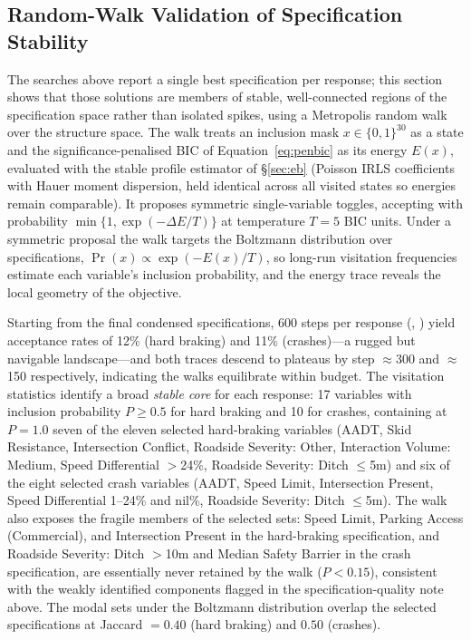 \documentclass[letterpaper,8pt]{extarticle}  %
\begin{document}
\begin{doublespacing}
\begin{linenumbers}
\FloatBarrier


\subsection{Random-Walk Validation of Specification Stability}\label{sec:randomwalk}

The searches above report a single best specification per response; this section shows that those solutions are members of stable, well-connected regions of the specification space rather than isolated spikes, using a Metropolis random walk over the structure space. The walk treats an inclusion mask $x \in \{0,1\}^{30}$ as a state and the significance-penalised BIC of Equation~\eqref{eq:penbic} as its energy $E(x)$, evaluated with the stable profile estimator of \S\ref{sec:eb} (Poisson IRLS coefficients with Hauer moment dispersion, held identical across all visited states so energies remain comparable). It proposes symmetric single-variable toggles, accepting with probability $\min\{1, \exp(-\Delta E / T)\}$ at temperature $T=5$ BIC units. Under a symmetric proposal the walk targets the Boltzmann distribution over specifications, $\Pr(x) \propto \exp(-E(x)/T)$, so long-run visitation frequencies estimate each variable's inclusion probability, and the energy trace reveals the local geometry of the objective.

Starting from the final condensed specifications, 600 steps per response (, ) yield acceptance rates of 12\% (hard braking) and 11\% (crashes)---a rugged but navigable landscape---and both traces descend to plateaus by step $\approx$300 and $\approx$150 respectively, indicating the walks equilibrate within budget. The visitation statistics identify a broad \emph{stable core} for each response: 17 variables with inclusion probability $P \geq 0.5$ for hard braking and 10 for crashes, containing at $P = 1.0$ seven of the eleven selected hard-braking variables (AADT, Skid Resistance, Intersection Conflict, Roadside Severity: Other, Interaction Volume: Medium, Speed Differential $>$24\%, Roadside Severity: Ditch $\leq$5m) and six of the eight selected crash variables (AADT, Speed Limit, Intersection Present, Speed Differential 1--24\% and nil\%, Roadside Severity: Ditch $\leq$5m). The walk also exposes the fragile members of the selected sets: Speed Limit, Parking Access (Commercial), and Intersection Present in the hard-braking specification, and Roadside Severity: Ditch $>$10m and Median Safety Barrier in the crash specification, are essentially never retained by the walk ($P < 0.15$), consistent with the weakly identified components flagged in the specification-quality note above. The modal sets under the Boltzmann distribution overlap the selected specifications at Jaccard $= 0.40$ (hard braking) and $0.50$ (crashes).


\end{linenumbers}
\end{doublespacing}
\end{document}
